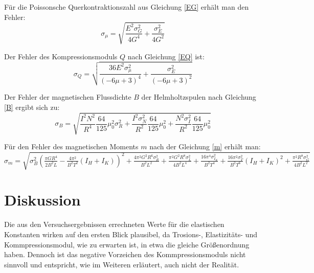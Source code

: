     Für die Poissonsche Querkontraktionszahl aus Gleichung \eqref{EG} erhält man den Fehler:
    \[
      \sigma_{\mu} = \sqrt{\frac{E^{2} \sigma_{G}^{2}}{4 G^{4}} + \frac{\sigma_{E}^{2}}{4 G^{2}}}
    \]
  
    Der Fehler des Kompressionsmoduls $Q$ nach Gleichung \eqref{EQ} ist:
    \[
      \sigma_{Q} = \sqrt{\frac{36 E^{2} \sigma_{\mu}^{2}}{\left(- 6 \mu + 3\right)^{4}} + \frac{\sigma_{E}^{2}}{\left(- 6 \mu + 3\right)^{2}}}
    \]
 
     Der Fehler der magnetischen Flussdichte $B$ der Helmholtzspulen nach Gleichung \eqref{B} ergibt sich zu:
    \[
      \sigma_{B} = \sqrt{\frac{I^{2} N^{2}}{R^{4}} \frac{64}{125}\mu_{0}^{2} \sigma_{R}^{2} + \frac{I^{2} \sigma_{N}^{2}}{R^{2}}\frac{64}{125}\mu_{0}^{2}+ \frac{N^{2} \sigma_{I}^{2}}{R^{2}} \frac{64}{125}\mu_{0}^{2}}
    \]
  
    Für den Fehler des magnetischen Moments $m$ nach der Gleichung \eqref{m} erhält man:\\
  
    $\sigma_{m} = \sqrt{\sigma_{B}^{2} \left(\frac{\pi G R^{4}}{2 B^{2} L} - \frac{ 4\pi^{2} }{B^{2} T^{2}} \left(I_{H} + I_{K}\right)\right)^{2} + \frac{4\pi^{2} G^{2} R^{6} \sigma_{R}^{2}}{B^{2} L^{2}} + 
     \frac{\pi^{2} G^{2} R^{8} \sigma_{L}^{2}}{4 B^{2} L^{4}} + \frac{16\pi^{4} \sigma_{I_{K}}^{2}}{B^{2} T^{4}} +
     \frac{16 \pi^{2} \sigma_{T}^{2}}{B^{2} T^{6}} \left(I_{H} + I_{K}\right)^{2} +  \frac{\pi^{2} R^{8} \sigma_{G}^{2}}{4 B^{2} L^{2}}}$
  
  
 
  
  \newpage
  \section{Diskussion}
    Die aus den Versuchsergebnissen errechneten Werte für die elastischen Konstanten wirken auf den ersten Blick plausibel,
    da Trosions-, Elastizitäts- und Kommpressionsmodul, wie zu erwarten ist, in etwa die gleiche Größenordnung haben. Dennoch 
    ist das negative Vorzeichen des Kommpressionsmoduls nicht sinnvoll und entspricht, wie im Weiteren erläutert, auch nicht der Realität.\\
    
